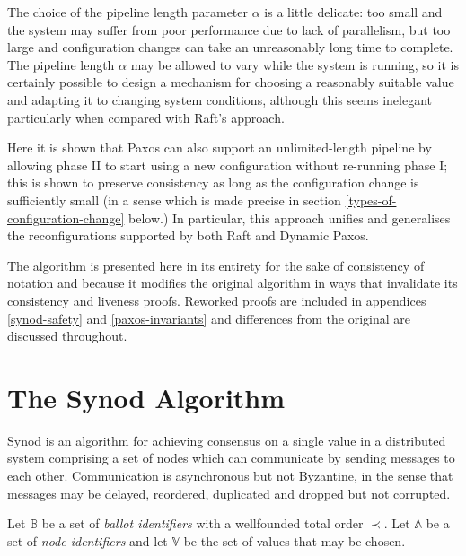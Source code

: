 \documentclass[journal]{IEEEtran}
\begin{document}
The choice of the pipeline length parameter $\alpha$ is a little delicate: too
small and the system may suffer from poor performance due to lack of
parallelism, but too large and configuration changes can take an unreasonably
long time to complete. The pipeline length $\alpha$ may be allowed to vary
while the system is running, so it is certainly possible to design a mechanism
for choosing a reasonably suitable value and adapting it to changing system
conditions, although this seems inelegant\cite{reconfiguring-a-state-machine}
particularly when compared with Raft's approach.

Here it is shown that Paxos can also support an unlimited-length pipeline by
allowing phase II to start using a new configuration without re-running phase
I; this is shown to preserve consistency as long as the configuration change is
sufficiently small (in a sense which is made precise in section
\ref{types-of-configuration-change} below.) In particular, this approach
unifies and generalises the reconfigurations supported by both Raft and Dynamic
Paxos.

The algorithm is presented here in its entirety for the sake of consistency of
notation and because it modifies the original algorithm in ways that invalidate
its consistency and liveness proofs. Reworked proofs are included in appendices
\ref{synod-safety} and \ref{paxos-invariants} and differences from the original
are discussed throughout.

\section{The Synod Algorithm}

Synod\cite{part-time-parliament} is an algorithm for achieving consensus on a
single value in a distributed system comprising a set of nodes which can
communicate by sending messages to each other. Communication is asynchronous
but not Byzantine, in the sense that messages may be delayed, reordered,
duplicated and dropped but not corrupted.

Let $\mathbb B$ be a set of \textit{ballot identifiers} with a wellfounded
total order $\prec$. Let $\mathbb A$ be a set of \textit{node identifiers} and
let $\mathbb V$ be the set of values that may be chosen.

\def\prep#1{\mathbf{prepare}(#1)}
\def\mprom#1#2#3{\mathbf{promised}_{\ge #1}(#2,#3)}
\def\fprom#1#2#3{\mathbf{promised}_{#1}(#2,#3)}
\def\bprom#1#2#3#4{\mathbf{promised}_{#1}(#2,#3;#4)}
\def\prop#1#2{\mathbf{proposed}_{#1}(#2)}
\def\acc#1#2#3{\mathbf{accepted}_{#1}(#2,#3)}
\def\chosen#1#2{\mathbf{chosen}_{#1}(#2)}
\def\owner#1{\mathrm{owner}(#1)}
\end{document}
